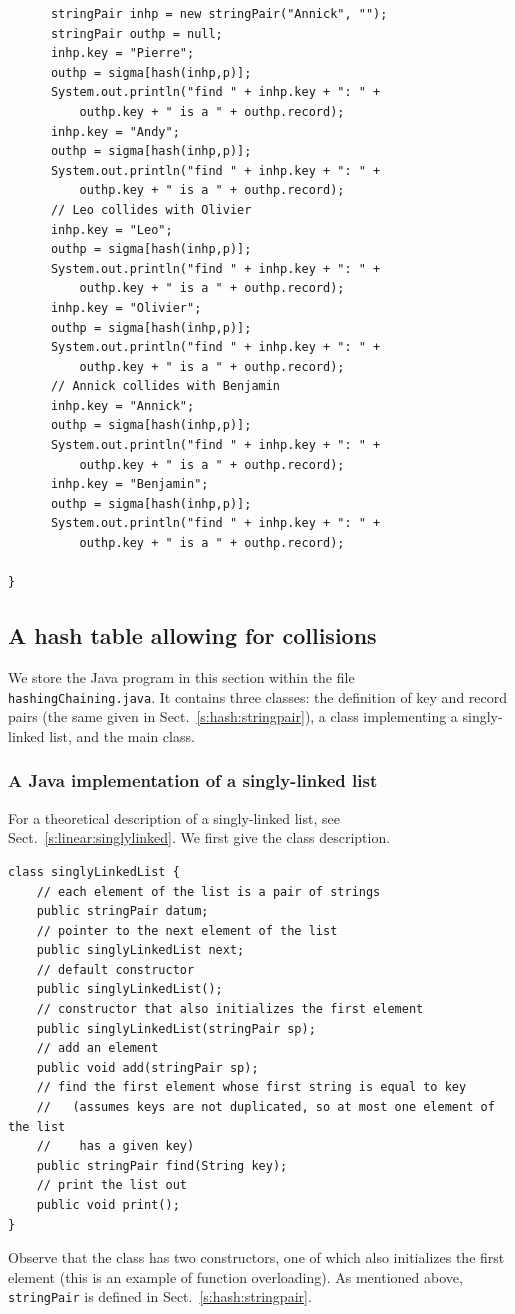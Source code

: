 \documentclass[a4paper]{book}
\theoremstyle{changebreak}                %
\begin{document}
\begin{verbatim}
      stringPair inhp = new stringPair("Annick", "");
      stringPair outhp = null;
      inhp.key = "Pierre";
      outhp = sigma[hash(inhp,p)];
      System.out.println("find " + inhp.key + ": " + 
          outhp.key + " is a " + outhp.record);
      inhp.key = "Andy";
      outhp = sigma[hash(inhp,p)];
      System.out.println("find " + inhp.key + ": " + 
          outhp.key + " is a " + outhp.record);
      // Leo collides with Olivier
      inhp.key = "Leo";
      outhp = sigma[hash(inhp,p)];
      System.out.println("find " + inhp.key + ": " + 
          outhp.key + " is a " + outhp.record);
      inhp.key = "Olivier";
      outhp = sigma[hash(inhp,p)];
      System.out.println("find " + inhp.key + ": " + 
          outhp.key + " is a " + outhp.record);
      // Annick collides with Benjamin
      inhp.key = "Annick";
      outhp = sigma[hash(inhp,p)];
      System.out.println("find " + inhp.key + ": " + 
          outhp.key + " is a " + outhp.record);
      inhp.key = "Benjamin";
      outhp = sigma[hash(inhp,p)];
      System.out.println("find " + inhp.key + ": " + 
          outhp.key + " is a " + outhp.record);

}
\end{verbatim}

\subsection{A hash table allowing for collisions}
We store the Java program in this section within the file {\tt
  hashingChaining.java}. It contains three classes: the definition of
key and record pairs (the same given in
Sect.~\ref{s:hash:stringpair}), a class implementing a singly-linked
list, and the main
class. 

\subsubsection{A Java implementation of a singly-linked list}
\label{s:hash:singlylinked}
For a theoretical description of a singly-linked list, see
Sect.~\ref{s:linear:singlylinked}. We first give the
class description. 
\begin{verbatim}
class singlyLinkedList {
    // each element of the list is a pair of strings
    public stringPair datum;
    // pointer to the next element of the list
    public singlyLinkedList next;
    // default constructor
    public singlyLinkedList();
    // constructor that also initializes the first element
    public singlyLinkedList(stringPair sp);
    // add an element
    public void add(stringPair sp);
    // find the first element whose first string is equal to key
    //   (assumes keys are not duplicated, so at most one element of the list
    //    has a given key)
    public stringPair find(String key);
    // print the list out
    public void print();
}
\end{verbatim}
Observe that the class has two constructors, one of which also
initializes the first element (this is an example of function
overloading). As mentioned above, {\tt stringPair}
is defined in Sect.~\ref{s:hash:stringpair}.
\end{document}
